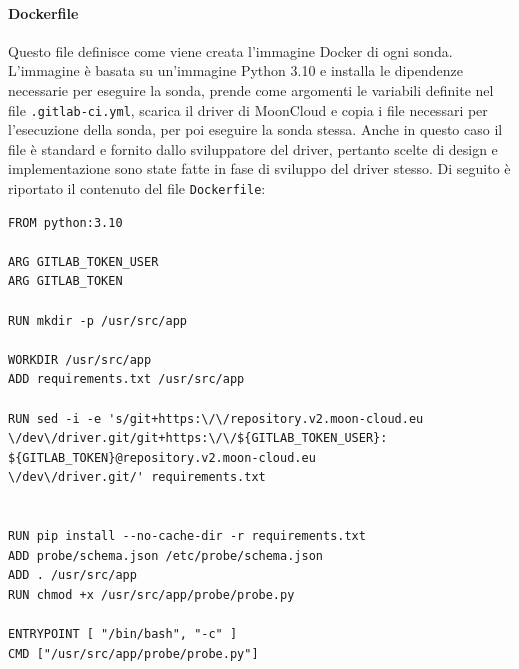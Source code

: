 \paragraph{Dockerfile} Questo file definisce come viene creata l'immagine Docker di ogni sonda. L'immagine è basata su un'immagine Python 3.10 e installa le dipendenze necessarie per eseguire la sonda, prende come argomenti le variabili definite nel file \texttt{.gitlab-ci.yml}, scarica il driver di MoonCloud e copia i file necessari per l'esecuzione della sonda, per poi eseguire la sonda stessa. Anche in questo caso il file è standard e fornito dallo sviluppatore del driver, pertanto scelte di design e implementazione sono state fatte in fase di sviluppo del driver stesso. Di seguito è riportato il contenuto del file \texttt{Dockerfile}:

\begin{lstlisting}[style=mydockerfile, caption={\texttt{Dockerfile} per la creazione dell'immagine della sonda}]
FROM python:3.10

ARG GITLAB_TOKEN_USER
ARG GITLAB_TOKEN

RUN mkdir -p /usr/src/app

WORKDIR /usr/src/app 
ADD requirements.txt /usr/src/app 

RUN sed -i -e 's/git+https:\/\/repository.v2.moon-cloud.eu
\/dev\/driver.git/git+https:\/\/${GITLAB_TOKEN_USER}:
${GITLAB_TOKEN}@repository.v2.moon-cloud.eu
\/dev\/driver.git/' requirements.txt


RUN pip install --no-cache-dir -r requirements.txt
ADD probe/schema.json /etc/probe/schema.json
ADD . /usr/src/app
RUN chmod +x /usr/src/app/probe/probe.py

ENTRYPOINT [ "/bin/bash", "-c" ]
CMD ["/usr/src/app/probe/probe.py"]
\end{lstlisting}

